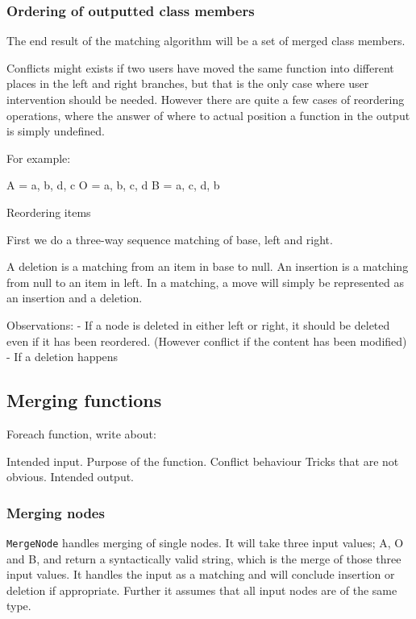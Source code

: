 \documentclass[11pt]{article}
\begin{document}
\subsubsection{Ordering of outputted class members}
The end result of the matching algorithm will be a set of merged class members. 

Conflicts might exists if two users have moved the same function into different places in the left and right branches, but that is the only case where user intervention should be needed. However there are quite a few cases of reordering operations, where the answer of where to actual position a function in the output is simply undefined. 

For example:

A = { a, b, d, c }
O = { a, b, c, d }
B = { a, c, d, b }


Reordering items 

First we do a three-way sequence matching of base, left and right. 

A deletion is a matching from an item in base to null.
An insertion is a matching from null to an item in left.
In a matching, a move will simply be represented as an insertion and a deletion.



Observations:
- If a node is deleted in either left or right, it should be deleted even if it has been reordered. (However conflict if the content has been modified)
- If a deletion happens 





\subsection{Merging functions}
Foreach function, write about:

Intended input.
Purpose of the function.
Conflict behaviour
Tricks that are not obvious.
Intended output.

\subsubsection{Merging nodes}
\texttt{MergeNode} handles merging of single nodes. It will take three input values; A, O and B, and return a syntactically valid string, which is the merge of those three input values. It handles the input as a matching and will conclude insertion or deletion if appropriate. Further it assumes that all input nodes are of the same type.
\end{document}
